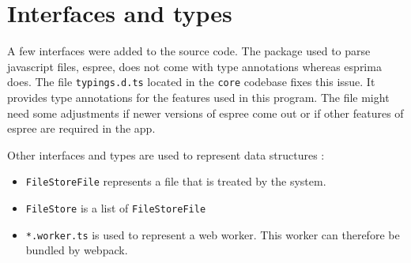 \section{Interfaces and types}
A few interfaces were added to the source code. The package used to parse javascript files, espree, does not come with type annotations whereas esprima does. The file \texttt{typings.d.ts} located in the \texttt{core} codebase fixes this issue. It provides type annotations for the features used in this program. The file might need some adjustments if newer versions of espree come out or if other features of espree are required in the app.

\noindent Other interfaces and types are used to represent data structures : 

\begin{itemize}
    \item \texttt{FileStoreFile} represents a file that is treated by the system.
    \item \texttt{FileStore} is a list of \texttt{FileStoreFile} 
    \item \texttt{*.worker.ts} is used to represent a web worker. This worker can therefore be bundled by webpack.
\end{itemize}